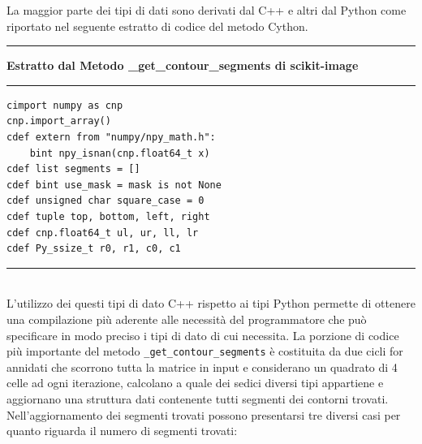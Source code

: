 \documentclass[12pt,a4paper]{report}
\begin{document}
La maggior parte dei tipi di dati sono derivati dal C++ e altri dal Python come riportato nel seguente estratto di codice del metodo Cython.  \newpage
\noindent\rule[0.5ex]{\linewidth}{2pt}
\small{\textbf{Estratto dal Metodo \_get\_contour\_segments di scikit-image}} \\
\noindent\rule[0.5ex]{\linewidth}{1pt}
\begin{lstlisting}
cimport numpy as cnp
cnp.import_array()
cdef extern from "numpy/npy_math.h":
    bint npy_isnan(cnp.float64_t x)
cdef list segments = []
cdef bint use_mask = mask is not None
cdef unsigned char square_case = 0
cdef tuple top, bottom, left, right
cdef cnp.float64_t ul, ur, ll, lr
cdef Py_ssize_t r0, r1, c0, c1
\end{lstlisting}
\noindent\rule[0.5ex]{\linewidth}{1pt} \\[10pt]
L'utilizzo dei questi tipi di dato C++ rispetto ai tipi Python permette di ottenere una compilazione più aderente alle necessità del programmatore che può specificare in modo preciso i tipi di dato di cui necessita. \newline
La porzione di codice più importante del metodo \verb|_get_contour_segments| è costituita da due cicli for annidati che scorrono tutta la matrice in input e considerano un quadrato di 4 celle ad ogni iterazione,  calcolano a quale dei sedici diversi tipi appartiene e aggiornano una struttura dati contenente tutti segmenti dei contorni trovati. \newline
Nell'aggiornamento dei segmenti trovati possono presentarsi tre diversi casi per quanto riguarda il numero di segmenti trovati:
\end{document}
